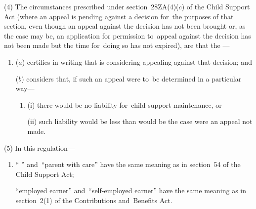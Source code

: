 \documentclass[12pt,a4paper]{article}
\begin{document}
(4) The circumstances prescribed under section~28ZA(4)($c$) of the Child Support Act (where an appeal is pending against a decision for~the purposes of that section, even though an appeal against the decision has not been brought or, as the case may be, an application for 
permission  %
to~appeal against the decision has not been made but the time for~doing so has not expired), are that the 
%
—
\begin{enumerate}\item[]
($a$) certifies in writing that 
%
is considering appealing against that decision; and

($b$) 
%
considers that, if such an appeal were to~be determined in a particular way—
\begin{enumerate}\item[]
(i) there would be no liability for~child support maintenance, or

(ii) such liability would be less than would be the case were an appeal not made.
\end{enumerate}
\end{enumerate}

(5) In this regulation—
\begin{enumerate}\item[]
“%
” and~“parent with care” have the same meaning as in section~54 of the Child Support Act;

“employed earner” and~“self-employed earner” have the same meaning as in section~2(1) of the Contributions and~Benefits Act.
\end{enumerate}

\end{document}
